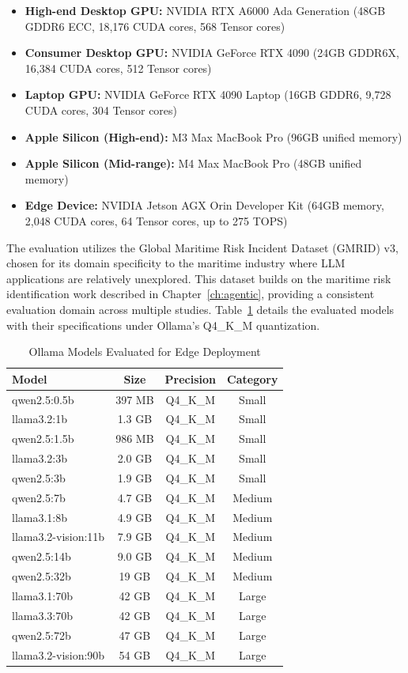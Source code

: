 \begin{itemize}[leftmargin=*]
    \item \textbf{High-end Desktop GPU:} NVIDIA RTX A6000 Ada Generation (48GB GDDR6 ECC, 18,176 CUDA cores, 568 Tensor cores)
    \item \textbf{Consumer Desktop GPU:} NVIDIA GeForce RTX 4090 (24GB GDDR6X, 16,384 CUDA cores, 512 Tensor cores)
    \item \textbf{Laptop GPU:} NVIDIA GeForce RTX 4090 Laptop (16GB GDDR6, 9,728 CUDA cores, 304 Tensor cores)
    \item \textbf{Apple Silicon (High-end):} M3 Max MacBook Pro (96GB unified memory)
    \item \textbf{Apple Silicon (Mid-range):} M4 Max MacBook Pro (48GB unified memory)
    \item \textbf{Edge Device:} NVIDIA Jetson AGX Orin Developer Kit (64GB memory, 2,048 CUDA cores, 64 Tensor cores, up to 275 TOPS)
\end{itemize}

The evaluation utilizes the Global Maritime Risk Incident Dataset (GMRID) v3, chosen for its domain specificity to the maritime industry where LLM applications are relatively unexplored. This dataset builds on the maritime risk identification work described in Chapter~\ref{ch:agentic}, providing a consistent evaluation domain across multiple studies. Table~\ref{tab:ollama_models} details the evaluated models with their specifications under Ollama's Q4\_K\_M quantization.

\begin{table}[htbp]
\centering
\caption{Ollama Models Evaluated for Edge Deployment}
\label{tab:ollama_models}
\begin{tabular}{@{}lccc@{}}
\toprule
\textbf{Model} & \textbf{Size} & \textbf{Precision} & \textbf{Category} \\
\midrule
qwen2.5:0.5b & 397 MB & Q4\_K\_M & Small \\
llama3.2:1b & 1.3 GB & Q4\_K\_M & Small \\
qwen2.5:1.5b & 986 MB & Q4\_K\_M & Small \\
llama3.2:3b & 2.0 GB & Q4\_K\_M & Small \\
qwen2.5:3b & 1.9 GB & Q4\_K\_M & Small \\
qwen2.5:7b & 4.7 GB & Q4\_K\_M & Medium \\
llama3.1:8b & 4.9 GB & Q4\_K\_M & Medium \\
llama3.2-vision:11b & 7.9 GB & Q4\_K\_M & Medium \\
qwen2.5:14b & 9.0 GB & Q4\_K\_M & Medium \\
qwen2.5:32b & 19 GB & Q4\_K\_M & Medium \\
llama3.1:70b & 42 GB & Q4\_K\_M & Large \\
llama3.3:70b & 42 GB & Q4\_K\_M & Large \\
qwen2.5:72b & 47 GB & Q4\_K\_M & Large \\
llama3.2-vision:90b & 54 GB & Q4\_K\_M & Large \\
\bottomrule
\end{tabular}
\end{table}

